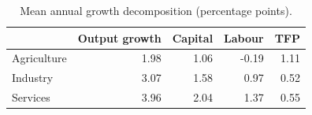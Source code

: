 \begin{table}[t]
\centering\small
\begin{tabular}{lrrrr}
\toprule
 & Output growth & Capital & Labour & TFP \\
\midrule
Agriculture & 1.98 & 1.06 & -0.19 & 1.11 \\
Industry & 3.07 & 1.58 & 0.97 & 0.52 \\
Services & 3.96 & 2.04 & 1.37 & 0.55 \\
\bottomrule
\end{tabular}
\caption{Mean annual growth decomposition (percentage points).}
\label{tab:dec}
\end{table}